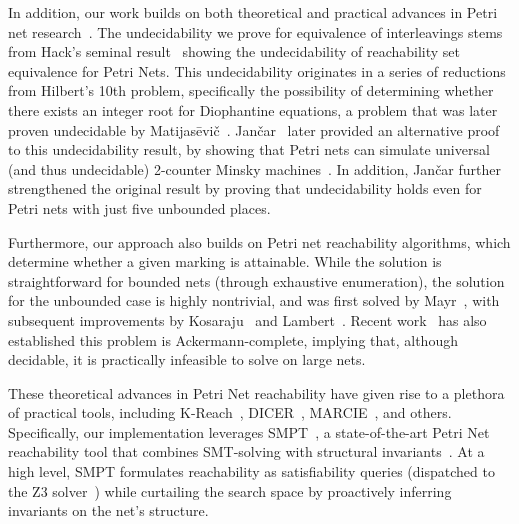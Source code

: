 
In addition, our work builds on both theoretical and practical advances in Petri net research~\cite{Mu89, Es96, Re12, EsNi24}. The undecidability we prove for equivalence of interleavings stems from Hack’s seminal result~\cite{Ha76, HaThesis76} showing the undecidability of reachability set equivalence for Petri Nets. This undecidability originates in a series of reductions from Hilbert’s 10th problem, specifically the possibility of determining whether there exists an integer root for Diophantine equations, a problem that was later proven undecidable by Matijasēvič~\cite{Ma70}.
%
Jančar~\cite{Ja95} later provided an alternative proof to this undecidability result, by showing that Petri nets can simulate universal (and thus undecidable) 2-counter Minsky machines~\cite{Mi67}. In addition, Jančar further strengthened the original result by proving that undecidability holds even for Petri nets with just five unbounded places.

Furthermore, our approach also builds on Petri net reachability algorithms, which determine whether a given marking is attainable. While the solution is straightforward for bounded nets (through exhaustive enumeration), the solution for the unbounded case is highly nontrivial, and was first solved by Mayr~\cite{Ma81}, with subsequent improvements by Kosaraju~\cite{Ko82} and Lambert~\cite{La92}. Recent work~\cite{CzWo22} has also established this problem is Ackermann-complete, implying that, although decidable, it is practically infeasible to solve on large nets.

These theoretical advances in Petri Net reachability have given rise to a plethora of practical tools, including K-Reach~\cite{DiLa20}, DICER~\cite{XiZhLi21}, MARCIE~\cite{HeRoSc13}, and others. 
%
Specifically, our implementation leverages SMPT~\cite{AmDa23}, a state-of-the-art Petri Net reachability tool that combines SMT-solving with structural invariants~\cite{AmBeDa21, AmDaHu22}. At a high level, SMPT formulates reachability as satisfiability queries (dispatched to the Z3 solver~\cite{DeBj08}) while curtailing the search space by proactively inferring invariants on the net's structure.
%


